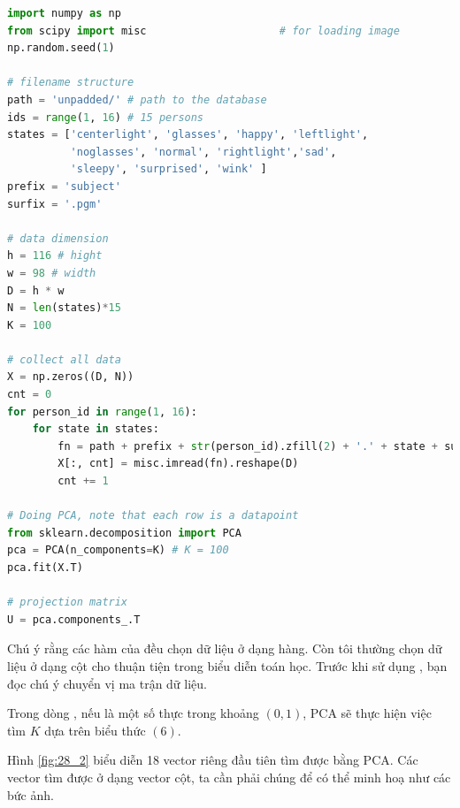 \begin{lstlisting}[language=Python]
import numpy as np 
from scipy import misc                     # for loading image 
np.random.seed(1) 
 
# filename structure 
path = 'unpadded/' # path to the database 
ids = range(1, 16) # 15 persons 
states = ['centerlight', 'glasses', 'happy', 'leftlight', 
          'noglasses', 'normal', 'rightlight','sad', 
          'sleepy', 'surprised', 'wink' ] 
prefix = 'subject' 
surfix = '.pgm' 
 
# data dimension 
h = 116 # hight 
w = 98 # width 
D = h * w 
N = len(states)*15 
K = 100 
 
# collect all data 
X = np.zeros((D, N)) 
cnt = 0 
for person_id in range(1, 16): 
    for state in states: 
        fn = path + prefix + str(person_id).zfill(2) + '.' + state + surfix 
        X[:, cnt] = misc.imread(fn).reshape(D) 
        cnt += 1 
 
# Doing PCA, note that each row is a datapoint 
from sklearn.decomposition import PCA 
pca = PCA(n_components=K) # K = 100 
pca.fit(X.T) 
 
# projection matrix 
U = pca.components_.T 
\end{lstlisting}
 
Chú ý rằng các hàm của  đều chọn dữ liệu ở dạng hàng. Còn tôi thường chọn dữ liệu ở dạng cột cho thuận tiện trong biểu diễn toán học. Trước khi sử dụng , bạn đọc chú ý chuyển vị ma trận dữ liệu. 
 
Trong dòng , nếu  là một số thực trong khoảng $(0, 1)$, PCA sẽ thực hiện việc tìm $K$ dựa trên biểu thức $(6)$. 
 
Hình \ref{fig:28_2} biểu diễn 18 vector riêng đầu tiên tìm được bằng PCA. Các vector tìm được ở dạng vector cột, ta cần phải  chúng để có thể minh hoạ như các bức ảnh. 
 
 

